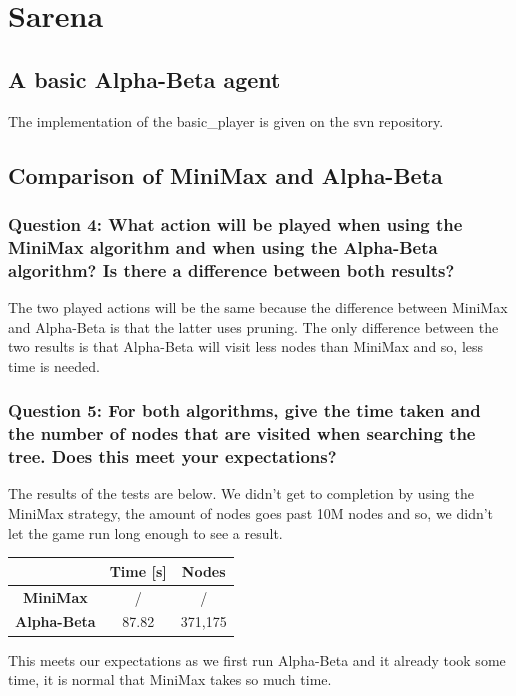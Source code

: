 \documentclass[a4paper,10pt]{article}
\begin{document}
	\section{Sarena}
		\subsection{A basic Alpha-Beta agent}
			The implementation of the basic\_player is given on the svn repository.
		\subsection{Comparison of MiniMax and Alpha-Beta}
			\subsubsection{Question 4: What action will be played when using the MiniMax algorithm and when using the Alpha-Beta algorithm? Is there a difference between both results?}
			The two played actions will be the same because the difference between MiniMax and Alpha-Beta is that the latter uses pruning. The only difference between the two results is that Alpha-Beta will visit less nodes than MiniMax and so, less time is needed.
			\subsubsection{Question 5: For both algorithms, give the time taken and the number of nodes that are visited when searching the tree. Does this meet your expectations?}
				The results of the tests are below. We didn't get to completion by using the MiniMax strategy, the amount of nodes goes past 10M nodes and so, we didn't let the game run long enough to see a result.
				\begin{center}
					\begin{tabular}{|c||c|c|}
						\hline 
						 & \textbf{Time [s]} & \textbf{Nodes} \\ 
						\hline 
						\textbf{MiniMax} & / & / \\ 
						\hline 
						\textbf{Alpha-Beta} & 87.82 & 371,175 \\
						\hline 
					\end{tabular}
				\end{center} 
				This meets our expectations as we first run Alpha-Beta and it already took some time, it is normal that MiniMax takes so much time.
\end{document}
